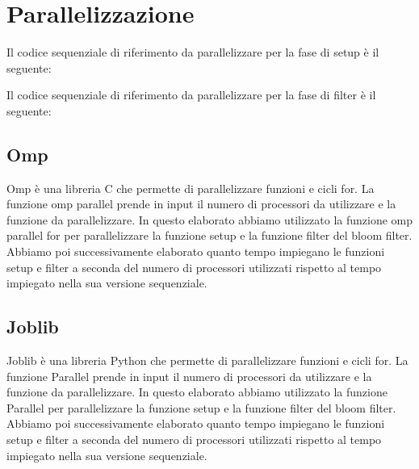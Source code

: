 \documentclass[11pt]{article}
\begin{document}
    \section{Parallelizzazione}\label{sec:parallelizazzione}
    Il codice sequenziale di riferimento da parallelizzare per la fase di setup è il seguente:
    
    

    Il codice sequenziale di riferimento da parallelizzare per la fase di filter è il seguente:
    
    

    \subsection{Omp}\label{subsec:omp}
    Omp è una libreria C che permette di parallelizzare funzioni e cicli for.
    La funzione omp parallel prende in input il numero di processori da utilizzare e la funzione da parallelizzare.
    In questo elaborato abbiamo utilizzato la funzione omp parallel for per parallelizzare la funzione setup e la
    funzione filter del bloom filter.
    Abbiamo poi successivamente elaborato quanto tempo impiegano le funzioni setup e filter a seconda del numero di
    processori utilizzati rispetto al tempo impiegato nella sua versione sequenziale.
    

    \subsection{Joblib}\label{subsec:joblib}
    Joblib è una libreria Python che permette di parallelizzare funzioni e cicli for.
    La funzione Parallel prende in input il numero di processori da utilizzare e la funzione da parallelizzare.
    In questo elaborato abbiamo utilizzato la funzione Parallel per parallelizzare la funzione setup e la funzione
    filter del bloom filter.
    Abbiamo poi successivamente elaborato quanto tempo impiegano le funzioni setup e filter a seconda del numero di
    processori utilizzati rispetto al tempo impiegato nella sua versione sequenziale.
    
    
\end{document}
